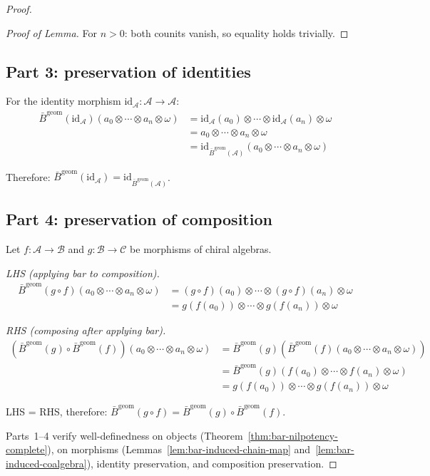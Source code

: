 \begin{proof}
\begin{proof}[Proof of Lemma]
For $n > 0$: both counits vanish, so equality holds trivially. \qedhere
\end{proof}

\subsection*{Part 3: preservation of identities}

For the identity morphism $\text{id}_\mathcal{A}: \mathcal{A} \to \mathcal{A}$:
\begin{align*}
\bar{B}^{\text{geom}}(\text{id}_\mathcal{A})(a_0 \otimes \cdots \otimes a_n \otimes \omega)
&= \text{id}_\mathcal{A}(a_0) \otimes \cdots \otimes \text{id}_\mathcal{A}(a_n) \otimes \omega \\
&= a_0 \otimes \cdots \otimes a_n \otimes \omega \\
&= \text{id}_{\bar{B}^{\text{geom}}(\mathcal{A})}(a_0 \otimes \cdots \otimes a_n \otimes \omega)
\end{align*}

Therefore: $\bar{B}^{\text{geom}}(\text{id}_\mathcal{A}) = \text{id}_{\bar{B}^{\text{geom}}(\mathcal{A})}$.

\subsection*{Part 4: preservation of composition}

Let $f: \mathcal{A} \to \mathcal{B}$ and $g: \mathcal{B} \to \mathcal{C}$ be morphisms of chiral algebras.

\emph{LHS (applying bar to composition).}
\begin{align*}
\bar{B}^{\text{geom}}(g \circ f)(a_0 \otimes \cdots \otimes a_n \otimes \omega)
&= (g \circ f)(a_0) \otimes \cdots \otimes (g \circ f)(a_n) \otimes \omega \\
&= g(f(a_0)) \otimes \cdots \otimes g(f(a_n)) \otimes \omega
\end{align*}

\emph{RHS (composing after applying bar).}
\begin{align*}
(\bar{B}^{\text{geom}}(g) \circ \bar{B}^{\text{geom}}(f))(a_0 \otimes \cdots \otimes a_n \otimes \omega)
&= \bar{B}^{\text{geom}}(g)(\bar{B}^{\text{geom}}(f)(a_0 \otimes \cdots \otimes a_n \otimes \omega)) \\
&= \bar{B}^{\text{geom}}(g)(f(a_0) \otimes \cdots \otimes f(a_n) \otimes \omega) \\
&= g(f(a_0)) \otimes \cdots \otimes g(f(a_n)) \otimes \omega
\end{align*}

LHS = RHS, therefore: $\bar{B}^{\text{geom}}(g \circ f) = \bar{B}^{\text{geom}}(g) \circ \bar{B}^{\text{geom}}(f)$.

Parts~1--4 verify well-definedness on objects (Theorem~\ref{thm:bar-nilpotency-complete}), on morphisms (Lemmas~\ref{lem:bar-induced-chain-map} and~\ref{lem:bar-induced-coalgebra}), identity preservation, and composition preservation.
\end{proof}

